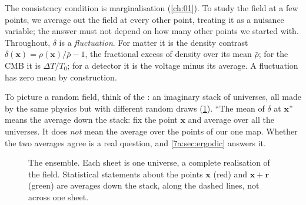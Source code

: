 The consistency condition is marginalisation (\cref{ch:01}). To study the field
at a few points, we average out the field at every other point, treating it as a
nuisance variable; the answer must not depend on how many other points we
started with. Throughout, $\delta$ is a \emph{fluctuation}. For matter it is the density contrast
$\delta(\bm x)=\rho(\bm x)/\bar\rho-1$, the fractional excess of density over its
mean $\bar\rho$; for the CMB it is $\Delta T/T_0$; for a detector it is the
voltage minus its average. A fluctuation has zero mean by construction.

To picture a random field, think of the : an imaginary stack of
universes, all made by the same physics but with different random draws
(\cref{7a:fig:ensemble}). ``The mean of $\delta$ at $\bm x$'' means the average
down the stack: fix the point $\bm x$ and average over all the universes. It does
\emph{not} mean the average over the points of our one map. Whether the two
averages agree is a real question, and \cref{7a:sec:ergodic} answers it.

\begin{figure}[htbp]
\centering
{}
\caption{The ensemble. Each sheet is one universe, a complete realisation of the
field. Statistical statements about the points $\bm x$ (red) and $\bm x+\bm r$
(green) are averages down the stack, along the dashed lines, not across one
sheet.}
\label{7a:fig:ensemble}
\end{figure}

